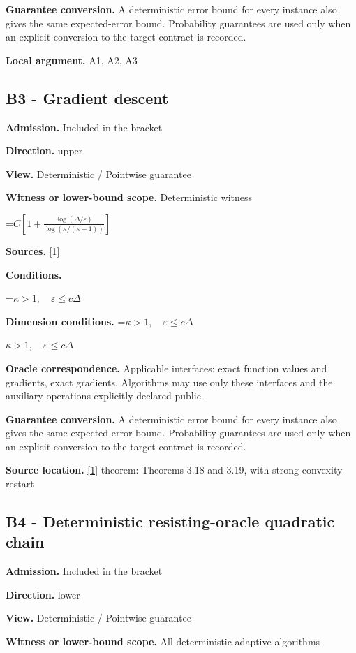 \documentclass[10pt,a4paper]{article}
\newcommand{\AtlasMath}[1]{\par\begingroup\centering\setbox0=\hbox{$\displaystyle #1$}\ifdim\wd0>1.4\linewidth\typeout{ATLAS WIDE FORMULA: \the\wd0}\fi\ifdim\wd0>\linewidth\resizebox{\linewidth}{!}{\box0}\else\box0\fi\par\endgroup}
\newcommand{\AtlasInlineMath}[1]{\begingroup\setbox0=\hbox{$#1$}\ifdim\wd0>.4\linewidth\endgroup\AtlasMath{#1}\else\endgroup$#1$\fi}
\begin{document}
\textbf{Guarantee conversion.} A deterministic error bound for every instance also gives the same expected-error bound. Probability guarantees are used only when an explicit conversion to the target contract is recorded.

\textbf{Local argument.} A1, A2, A3

\subsection{B3 - Gradient descent}
\textbf{Admission.} Included in the bracket

\textbf{Direction.} upper

\textbf{View.} Deterministic / Pointwise guarantee

\textbf{Witness or lower-bound scope.} Deterministic witness

\AtlasMath{C\left[1+\frac{\log(\Delta/\varepsilon)}{\log(\kappa/(\kappa-1))}\right]}
\textbf{Sources.} \href{https://arxiv.org/pdf/1405.4980}{[1]}

\textbf{Conditions.} 
\AtlasMath{\kappa>1,\quad\varepsilon\le c\Delta}


\textbf{Dimension conditions.} \AtlasInlineMath{\kappa>1,\quad\varepsilon\le c\Delta}

\textbf{Oracle correspondence.} Applicable interfaces: exact function values and gradients, exact gradients. Algorithms may use only these interfaces and the auxiliary operations explicitly declared public.

\textbf{Guarantee conversion.} A deterministic error bound for every instance also gives the same expected-error bound. Probability guarantees are used only when an explicit conversion to the target contract is recorded.

\textbf{Source location.} \href{https://arxiv.org/pdf/1405.4980}{[1]} theorem: Theorems 3.18 and 3.19, with strong-convexity restart

\subsection{B4 - Deterministic resisting-oracle quadratic chain}
\textbf{Admission.} Included in the bracket

\textbf{Direction.} lower

\textbf{View.} Deterministic / Pointwise guarantee

\textbf{Witness or lower-bound scope.} All deterministic adaptive algorithms
\end{document}
